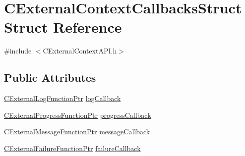 \hypertarget{structCExternalContextCallbacksStruct}{
\section{CExternalContextCallbacksStruct Struct Reference}
\label{structCExternalContextCallbacksStruct}
}


{\ttfamily \#include $<$CExternalContextAPI.h$>$}\subsection*{Public Attributes}
\begin{DoxyCompactItemize}
\item 
\hyperlink{CExternalContextAPI_8h_a5b4bfc6e4777e8f4cdcea9ee2d942d9c}{CExternalLogFunctionPtr} \hyperlink{structCExternalContextCallbacksStruct_a982409f42f2b01702c5b5d425759c5a7}{logCallback}
\item 
\hyperlink{CExternalContextAPI_8h_a271021a1310d0456562874a93a28bc0d}{CExternalProgressFunctionPtr} \hyperlink{structCExternalContextCallbacksStruct_a08193c0bd78f03ade4d52697ac786631}{progressCallback}
\item 
\hyperlink{CExternalContextAPI_8h_ae160e7283960834ffd5312f6f796a64d}{CExternalMessageFunctionPtr} \hyperlink{structCExternalContextCallbacksStruct_afc1c0148e8ec645fc9840ce0137d5246}{messageCallback}
\item 
\hyperlink{CExternalContextAPI_8h_a8f61d0476b2df22d6356eefb523c46b4}{CExternalFailureFunctionPtr} \hyperlink{structCExternalContextCallbacksStruct_aedf7fcbc2c67d202b9cbe4c3250d6e59}{failureCallback}
\end{DoxyCompactItemize}


